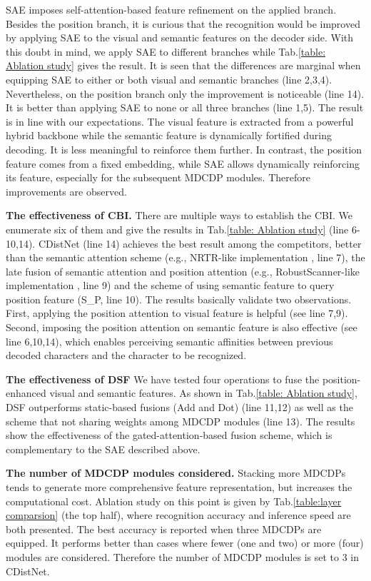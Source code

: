 SAE imposes self-attention-based feature refinement on the applied branch. Besides the position branch, it is curious that the recognition would be improved by applying SAE to the visual and semantic features on the decoder side. With this doubt in mind, we apply SAE to different branches while Tab.\ref{table: Ablation study} gives the result. It is seen that the differences are marginal when equipping SAE to either or both visual and semantic branches (line 2,3,4). Nevertheless, on the position branch only the improvement is noticeable (line 14). It is better than applying SAE to none or all three branches (line 1,5). The result is in line with our expectations. The visual feature is extracted from a powerful hybrid backbone while the semantic feature is dynamically fortified during decoding. It is less meaningful to reinforce them further. In contrast, the position feature comes from a fixed embedding, while SAE allows dynamically reinforcing its feature, especially for the subsequent MDCDP modules. Therefore improvements are observed.


\noindent\textbf{The effectiveness of CBI.}
There are multiple ways to establish the CBI. We enumerate six of them and give the results in Tab.\ref{table: Ablation study} (line 6-10,14). CDistNet (line 14) achieves the best result among the competitors, better than the semantic attention scheme (e.g., NRTR-like implementation \citep{sheng2019nrtr}, line 7), the late fusion of semantic attention and position attention (e.g., RobustScanner-like implementation \citep{yue2020robustscanner}, line 9) and the scheme of using semantic feature to query position feature (S\_P, line 10). The results basically validate two observations. First, applying the position attention to visual feature is helpful (see line 7,9). Second, imposing the position attention on semantic feature is also effective (see line 6,10,14), which enables perceiving semantic affinities between previous decoded characters and the character to be recognized.

\noindent\textbf{The effectiveness of DSF}
We have tested four operations to fuse the position-enhanced visual and semantic features. As shown in Tab.\ref{table: Ablation study}, DSF outperforms static-based fusions (Add and Dot) (line 11,12) as well as the scheme that not sharing weights among MDCDP modules (line 13). The results show the effectiveness of the gated-attention-based fusion scheme, which is complementary to the SAE described above.


\noindent\textbf{The number of MDCDP modules considered.}
Stacking more MDCDPs tends to generate more comprehensive feature representation, but increases the computational cost. Ablation study on this point is given by Tab.\ref{table:layer comparsion} (the top half), where recognition accuracy and inference speed are both presented. The best accuracy is reported when three MDCDPs are equipped. It performs better than cases where fewer (one and two) or more (four) modules are considered. Therefore the number of MDCDP modules is set to 3 in CDistNet.


